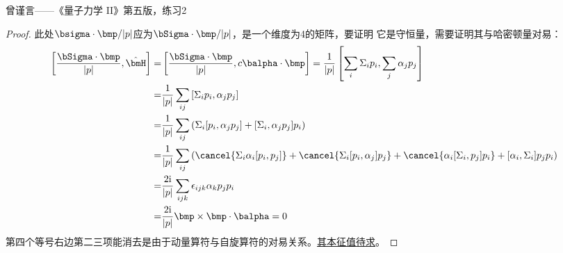 曾谨言——《量子力学 II》第五版，练习2
\begin{proof}
    此处$\bsigma \cdot \bmp / |p|$应为$\bSigma\cdot\bmp/|p|$，是一个维度为4的矩阵，要证明
    它是守恒量，需要证明其与哈密顿量对易：
    \begin{equation}
        \begin{aligned}
            \left[ \frac{\bSigma\cdot\bmp}{|p|}, \hat{\bmH} \right] =&
            \left[ \frac{\bSigma\cdot\bmp}{|p|}, c\balpha\cdot\bmp \right]
            = \frac{1}{|p|} \left[ \sum_i\Sigma_i p_i, \sum_j\alpha_j p_j \right] \\
            =& \frac{1}{|p|} \sum_{ij} \left[ \Sigma_i p_i, \alpha_j p_j \right] \\
            =& \frac{1}{|p|} \sum_{ij} 
               \left( \Sigma_i [p_i, \alpha_j p_j] + [\Sigma_i, \alpha_j p_j] p_i \right) \\
            =& \frac{1}{|p|} \sum_{ij} \left( 
                \cancel{\Sigma_i \alpha_i[p_i, p_j]} + \cancel{\Sigma_i [p_i, \alpha_j]p_j}
              + \cancel{\alpha_i[\Sigma_i, p_j]p_i} + [\alpha_i, \Sigma_i]p_j p_i
               \right) \\
            =& \frac{2{\rm i}}{|p|}\sum_{ijk}\epsilon_{ijk}\alpha_k p_j p_i \\
            =& \frac{2{\rm i}}{|p|}\bmp \times \bmp \cdot \balpha = 0
        \end{aligned}
    \end{equation}
    第四个等号右边第二三项能消去是由于动量算符与自旋算符的对易关系。\uline{其本征值待求}。
\end{proof}
